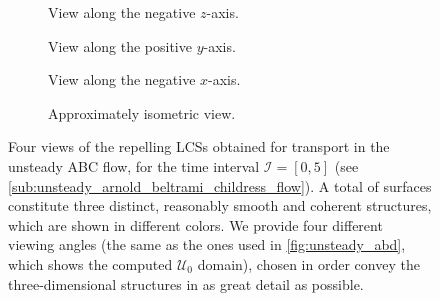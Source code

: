 \begin{figure}[htpb]
    \centering
    \hspace*{\fill}
    \begin{subfigure}[b]{0.42\textwidth}
        \centering
        \caption[]{{\small View along the negative $z$-axis.}}
        \label{fig:unsteady_lcss_z}
    \end{subfigure}\hfill%
    \begin{subfigure}[b]{0.42\textwidth}
        \centering
        \caption[]{{\small View along the positive $y$-axis.}}
        \label{fig:unsteady_lcss_y}
    \end{subfigure}%
    \hspace*{\fill}

    \hspace*{\fill}
    \begin{subfigure}[b]{0.42\textwidth}
        \centering
        \caption[]{{\small View along the negative $x$-axis.}}
        \label{fig:unsteady_lcss_x}
    \end{subfigure}\hfill%
    \begin{subfigure}[b]{0.42\textwidth}
        \centering
        \caption[]{{\small Approximately isometric view.}}
        \label{fig:unsteady_lcss_isometric}
    \end{subfigure}%
    \hspace*{\fill}
    \caption[Four views of the repelling LCSs obtained for transport in the
    unsteady ABC \newline{}flow]
    {
        Four views of the repelling LCSs obtained for transport in the unsteady
        ABC flow, for the time interval $\mathcal{I}=[0,5]$ (see
        \cref{sub:unsteady_arnold_beltrami_childress_flow}). A total of
         surfaces constitute three distinct, reasonably smooth and
        coherent structures, which are shown in different colors. We provide
        four different viewing angles (the same as the ones used in
        \cref{fig:unsteady_abd}, which shows the computed $\mathcal{U}_{0}$
        domain), chosen in order convey the three-dimensional structures in as
        great detail as possible.
}
    \label{fig:unsteady_lcss}
\end{figure}

